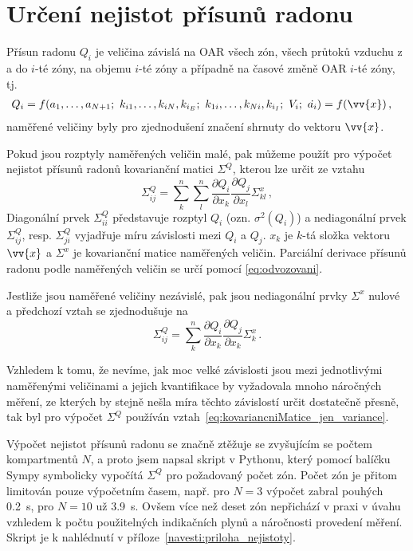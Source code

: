 \section{Určení nejistot přísunů radonu}
Přísun radonu $Q_i$ je veličina závislá na OAR všech zón, všech průtoků vzduchu z a do $i$-té zóny, na objemu $i$-té zóny a případně na časové změně OAR $i$-té zóny, tj. 
\begin{align}
    Q_i&=f(a_1, \dots, a_{N+1};\ k_{i1}, \dots , k_{iN}, k_{i_E};\ k_{1i}, \dots , k_{Ni}, k_{i_I};\ V_i;\ \dot{a_i})=f(\vv{x})\,,
\end{align}
naměřené veličiny byly pro zjednodušení značení shrnuty do vektoru $\vv{x}$.

Pokud jsou rozptyly naměřených veličin malé, pak můžeme použít pro výpočet nejistot přísunů radonů kovarianční matici $\Sigma^{Q}$, kterou lze určit ze vztahu
\begin{equation}
    \Sigma_{ij}^{Q}=\sum_{k}^n\sum_l^n\frac{\partial Q_i}{\partial x_k}\frac{\partial Q_j}{\partial x_l}\Sigma_{kl}^x\,,
    \label{eq:kovariancniMatice_obecne}
\end{equation}
Diagonální prvek $\Sigma_{ii}^Q$ představuje rozptyl $Q_i$ (ozn. $\sigma^2(Q_i)$) a nediagonální prvek $\Sigma_{ij}^Q$, resp. $\Sigma_{ji}^Q$ vyjadřuje míru závislosti mezi $Q_i$ a $Q_j$. $x_k$ je $k$-tá složka vektoru $\vv{x}$ a $\Sigma^x$ je kovarianční matice naměřených veličin. Parciální derivace přísunů radonu podle naměřených veličin se určí pomocí \eqref{eq:odvozovani}.

Jestliže jsou naměřené veličiny nezávislé, pak jsou nediagonální prvky $\Sigma^x$ nulové a předchozí vztah se zjednodušuje na 
\begin{equation}
    \Sigma_{ij}^{Q}=\sum_{k}^n\frac{\partial Q_i}{\partial x_k}\frac{\partial Q_j}{\partial x_k}\Sigma_{k}^x\,.
    \label{eq:kovariancniMatice_jen_variance}
\end{equation}

Vzhledem k tomu, že nevíme, jak moc velké závislosti jsou mezi jednotlivými naměřenými veličinami a jejich kvantifikace by vyžadovala mnoho náročných měření, ze kterých by stejně nešla míra těchto závislostí určit dostatečně přesně, tak byl pro výpočet $\Sigma^Q$ používán vztah~\eqref{eq:kovariancniMatice_jen_variance}. 

Výpočet nejistot přísunů radonu se značně ztěžuje se zvyšujícím se počtem kompartmentů $N$, a proto jsem napsal skript v Pythonu, který pomocí balíčku Sympy symbolicky vypočítá $\Sigma^Q$ pro požadovaný počet zón. Počet zón je přitom limitován pouze výpočetním časem, např. pro $N=3$ výpočet zabral pouhých \SI{0.2}{s}, pro $N=10$ už \SI{3.9}{s}. Ovšem více než deset zón nepřichází v praxi v úvahu vzhledem k počtu použitelných indikačních plynů a náročnosti provedení měření. Skript je k nahlédnutí v příloze~\ref{navesti:priloha_nejistoty}.

